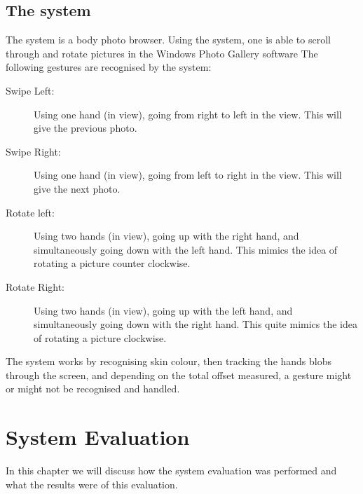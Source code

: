 \documentclass[11pt,a4paper]{article}
\begin{document}

\subsection{The system}
\label{sub:system}
The system is a body photo browser. Using the system, one is able to scroll through and rotate pictures in the Windows Photo Gallery software %
The following gestures are recognised by the system:

\begin{description}
\item[Swipe Left:] Using one hand (in view), going from right to left in the view. This will give the previous photo.
\item[Swipe Right:] Using one hand (in view), going from left to right in the view. This will give the next photo.
\item[Rotate left:] Using two hands (in view), going up with the right hand, and simultaneously going down with the left hand. This mimics the idea of rotating a picture counter clockwise.
\item[Rotate Right:] Using two hands (in view), going up with the left hand, and simultaneously going down with the right hand. This quite mimics the idea of rotating a picture clockwise.
\end{description}

The system works by recognising skin colour, then tracking the hands blobs through the screen, and depending on the total offset measured, a gesture might or might not be recognised and handled. 

\section{System Evaluation}
In this chapter we will discuss how the system evaluation was performed and what the results were of this evaluation.
 
\end{document}
